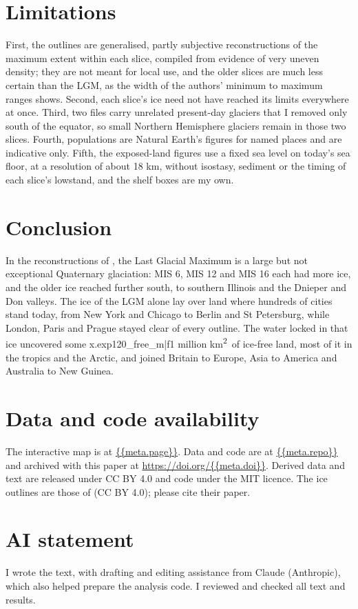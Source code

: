\documentclass[11pt,a4paper]{article}
\newcommand{\kmq}{km\textsuperscript{2}}
\begin{document}
\section{Limitations}
First, the outlines are generalised, partly subjective reconstructions of the maximum extent within each slice, compiled from evidence of very uneven density; they are not meant for local use, and the older slices are much less certain than the LGM, as the width of the authors' minimum to maximum ranges shows. Second, each slice's ice need not have reached its limits everywhere at once. Third, two files carry unrelated present-day glaciers that I removed only south of the equator, so small Northern Hemisphere glaciers remain in those two slices. Fourth, populations are Natural Earth's figures for named places and are indicative only. Fifth, the exposed-land figures use a fixed sea level on today's sea floor, at a resolution of about 18 km, without isostasy, sediment or the timing of each slice's lowstand, and the shelf boxes are my own.

\section{Conclusion}
In the reconstructions of \citet{batchelor}, the Last Glacial Maximum is a large but not exceptional Quaternary glaciation: MIS 6, MIS 12 and MIS 16 each had more ice, and the older ice reached further south, to southern Illinois and the Dnieper and Don valleys. The ice of the LGM alone lay over land where hundreds of cities stand today, from New York and Chicago to Berlin and St Petersburg, while London, Paris and Prague stayed clear of every outline. The water locked in that ice uncovered some {{x.exp120_free_m|f1}} million \kmq\ of ice-free land, most of it in the tropics and the Arctic, and joined Britain to Europe, Asia to America and Australia to New Guinea.

\section*{Data and code availability}
The interactive map is at \url{{{meta.page}}}. Data and code are at \url{{{meta.repo}}} and archived with this paper at \url{https://doi.org/{{meta.doi}}}. Derived data and text are released under CC BY 4.0 and code under the MIT licence. The ice outlines are those of \citet{batchelor} (CC BY 4.0); please cite their paper.

\section*{AI statement}
I wrote the text, with drafting and editing assistance from Claude (Anthropic), which also helped prepare the analysis code. I reviewed and checked all text and results.
\end{document}
